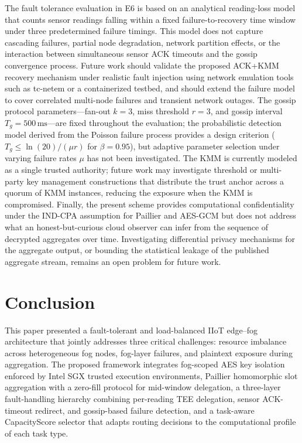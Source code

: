 \documentclass[conference]{IEEEtran}
\begin{document}
    The fault tolerance evaluation in E6 is based on an analytical reading-loss model that counts sensor readings falling within a fixed failure-to-recovery time window under three predetermined failure timings. This model does not capture cascading failures, partial node degradation, network partition effects, or the interaction between simultaneous sensor ACK timeouts and the gossip convergence process. Future work should validate the proposed ACK+KMM recovery mechanism under realistic fault injection using network emulation tools such as tc-netem or a containerized testbed, and should extend the failure model to cover correlated multi-node failures and transient network outages. The gossip protocol parameters---fan-out $k{=}3$, miss threshold $r{=}3$, and gossip interval $T_g{=}500\,\text{ms}$---are fixed throughout the evaluation; the probabilistic detection model derived from the Poisson failure process provides a design criterion ($T_g \leq \ln(20)/(\mu r)$ for $\beta=0.95$), but adaptive parameter selection under varying failure rates $\mu$ has not been investigated. The KMM is currently modeled as a single trusted authority; future work may investigate threshold or multi-party key management constructions that distribute the trust anchor across a quorum of KMM instances, reducing the exposure when the KMM is compromised. Finally, the present scheme provides computational confidentiality under the IND-CPA assumption for Paillier and AES-GCM but does not address what an honest-but-curious cloud observer can infer from the sequence of decrypted aggregates over time. Investigating differential privacy mechanisms for the aggregate output, or bounding the statistical leakage of the published aggregate stream, remains an open problem for future work.

    \section{Conclusion}

    This paper presented a fault-tolerant and load-balanced IIoT edge--fog architecture that jointly addresses three critical challenges: resource imbalance across heterogeneous fog nodes, fog-layer failures, and plaintext exposure during aggregation. The proposed framework integrates fog-scoped AES key isolation enforced by Intel SGX trusted execution environments, Paillier homomorphic slot aggregation with a zero-fill protocol for mid-window delegation, a three-layer fault-handling hierarchy combining per-reading TEE delegation, sensor ACK-timeout redirect, and gossip-based failure detection, and a task-aware CapacityScore selector that adapts routing decisions to the computational profile of each task type.
\end{document}
